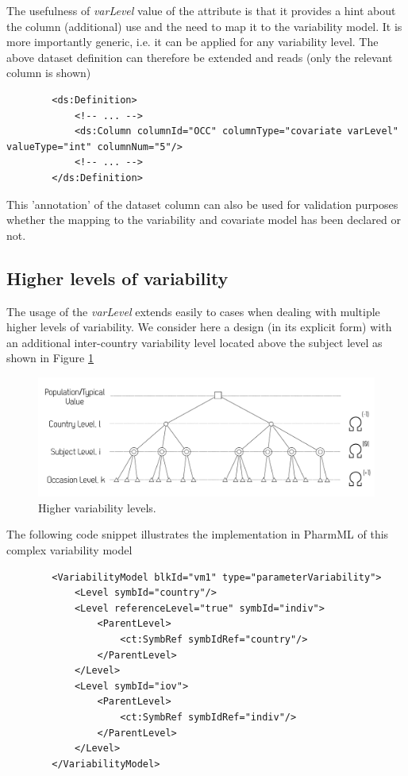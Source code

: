 \smallskip
The usefulness of \emph{varLevel} value of the  attribute is that 
it provides a hint about the column (additional) use and the need to map it to 
the variability model. It is more importantly generic, i.e. it can be applied for 
any variability level. The above dataset definition can therefore be extended 
and reads (only the relevant column is shown)	
\lstset{language=XML}
\begin{lstlisting}
        <ds:Definition>
            <!-- ... -->
            <ds:Column columnId="OCC" columnType="covariate varLevel" valueType="int" columnNum="5"/>
            <!-- ... -->
        </ds:Definition>
\end{lstlisting}

This 'annotation' of the dataset column can also be used for validation 
purposes whether the mapping to the variability and covariate model has been declared or not.

\subsection{Higher levels of variability}
The usage of the \emph{varLevel} extends easily to cases when dealing with 
multiple higher levels of variability. We consider here a design (in its explicit form) with 
an additional inter-country variability level located above the subject level 
as shown in Figure \ref{fig:interCountry} 

\begin{figure}[ht!]
\centering
  \includegraphics[width=140mm]{pics/HyperVarLevels.pdf}
 \caption{Higher variability levels.}
 \label{fig:interCountry}
\end{figure}

The following code snippet illustrates the implementation in PharmML of 
this complex variability model
\lstset{language=XML}
\begin{lstlisting}
        <VariabilityModel blkId="vm1" type="parameterVariability">
            <Level symbId="country"/>
            <Level referenceLevel="true" symbId="indiv">
                <ParentLevel>
                    <ct:SymbRef symbIdRef="country"/>
                </ParentLevel>
            </Level>
            <Level symbId="iov">
                <ParentLevel>
                    <ct:SymbRef symbIdRef="indiv"/>
                </ParentLevel>
            </Level>
        </VariabilityModel>
\end{lstlisting}

